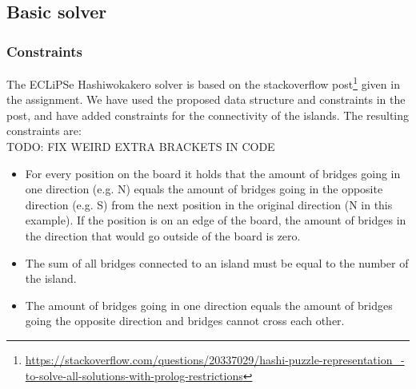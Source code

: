 \documentclass{report}
\begin{document}
\subsection{Basic solver}
\subsubsection{Constraints}
The ECLiPSe Hashiwokakero solver is based on the stackoverflow post\footnote{\url{https://stackoverflow.com/questions/20337029/hashi-puzzle-representation\_-to-solve-all-solutions-with-prolog-restrictions}} given in the assignment. We have used the proposed data structure and constraints in the post, and have added constraints for the connectivity of the islands. The resulting constraints are:
\\
TODO: FIX WEIRD EXTRA BRACKETS IN CODE
\begin{itemize}
	\item For every position on the board it holds that the amount of bridges going in one direction (e.g. N) equals the amount of bridges going in the opposite direction (e.g. S) from the next position in the original direction (N in this example). If the position is on an edge of the board, the amount of bridges in the direction that would go outside of the board is zero.
	
        
        
    \item The sum of all bridges connected to an island must be equal to the number of the island. 
        
        
    \item The amount of bridges going in one direction equals the amount of bridges going the opposite direction and bridges cannot cross each other. 
        
        

\end{itemize}
\end{document}
